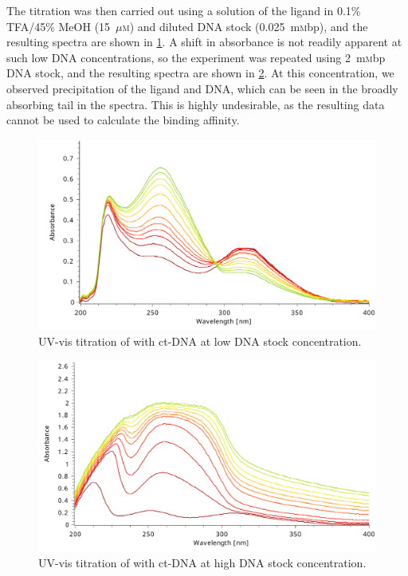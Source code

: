 \begin{refsection}
The titration was then carried out using a solution of the ligand in 0.1\% TFA/45\% MeOH (15~$\mu$\textsc{m}) and diluted DNA stock (0.025~m\textsc{m}bp), and the resulting spectra are shown in \cref{fig:ebshoe-ctdna-lowconc}.
A shift in absorbance is not readily apparent at such low DNA concentrations, so the experiment was repeated using 2~m\textsc{m}bp DNA stock, and the resulting spectra are shown in \cref{fig:ebshoe-ctdna-hiconc}.
At this concentration, we observed precipitation of the ligand and DNA, which can be seen in the broadly absorbing tail in the spectra.
This is highly undesirable, as the resulting data cannot be used to calculate the binding affinity.

\begin{figure}
    \includegraphics[width=0.7\linewidth]{Figures/ebshoe-ctdna-lowconc.pdf}
    \caption{UV-vis titration of  with ct-DNA at low DNA stock concentration.}\label{fig:ebshoe-ctdna-lowconc}
\end{figure}

\begin{figure}
    \includegraphics[width=0.7\linewidth]{Figures/ebshoe-ctdna-hiconc.pdf}
    \caption{UV-vis titration of  with ct-DNA at high DNA stock concentration.}\label{fig:ebshoe-ctdna-hiconc}
\end{figure}


\end{refsection}
